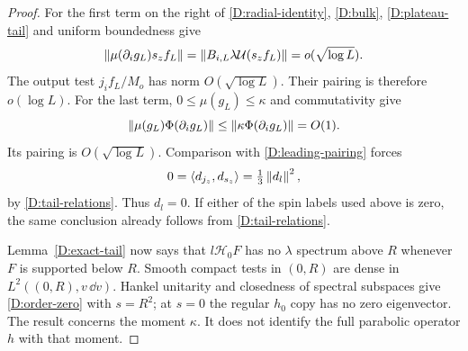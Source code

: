 \begin{proof}
For the first term on the right of \eqref{D:radial-identity},
\eqref{D:bulk}, \eqref{D:plateau-tail} and uniform boundedness give
\[
 \left\lVert\mu(\partial_i g_L)s_zf_L\right\rVert
 =\left\lVert B_{i,L}\lambda\mathcal U(s_zf_L)\right\rVert
 =o(\sqrt{\log L}).
\]
The output test $j_if_L/M_o$ has norm $O(\sqrt{\log L})$.
Their pairing is therefore $o(\log L)$.  For the last term,
$0\leq\mu(g_L)\leq\kappa$ and commutativity give
\[
 \left\lVert\mu(g_L)\Phi(\partial_i g_L)\right\rVert
 \leq\left\lVert\kappa\Phi(\partial_i g_L)\right\rVert=O(1).
\]
Its pairing is $O(\sqrt{\log L})$.
Comparison with \eqref{D:leading-pairing} forces
\[
 0=\left\langle d_{j_z},d_{s_z}\right\rangle=\tfrac13\left\lVert d_l\right\rVert^2,
\]
by \eqref{D:tail-relations}.  Thus $d_l=0$.
If either of the spin labels used above is zero, the same
conclusion already follows from \eqref{D:tail-relations}.

Lemma~\ref{D:exact-tail} now says that $l\mathcal H_0F$ has no
$\lambda$ spectrum above $R$ whenever $F$ is supported below
$R$.  Smooth compact tests in $(0,R)$ are dense in
$L^2((0,R),v\,\dd v)$.  Hankel unitarity and closedness of
spectral subspaces give \eqref{D:order-zero} with $s=R^2$;
at $s=0$ the regular $h_0$ copy has no zero eigenvector.
The result concerns the moment $\kappa$.  It does not identify
the full parabolic operator $h$ with that moment.
\end{proof}

